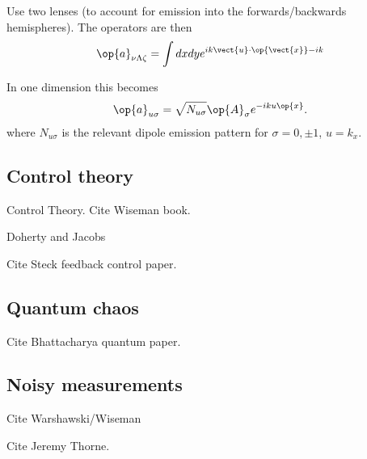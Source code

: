 Use two lenses (to account for emission into the forwards/backwards hemispheres).  
The operators are then 
\begin{align}
  \op{a}_{\nu\Lambda \zeta} = \int dx dy e^{ik \vect{u}\cdot\op{\vect{x}}-ik}
\end{align}

In one dimension this becomes 
\begin{align}
  \op{a}_{u\sigma} = \sqrt{N_{u\sigma}}\op{A}_\sigma e^{-ik u \op{x}}.
\end{align}
where $N_{u\sigma}$ is the relevant dipole emission pattern for $\sigma=0,\pm 1$, $u=k_x$.



\subsection{Control theory}
 Control Theory.  Cite Wiseman book.   \cite{WisemanMilburn2010}

Doherty and Jacobs \cite{Doherty1999}

Cite Steck feedback control paper.  \cite{Steck2004, Steck2006}

\subsection{Quantum chaos}

Cite Bhattacharya quantum paper.  \cite{Bhattacharya2000}

\subsection{Noisy measurements}
Cite Warshawski/Wiseman \cite{Warszawski2003a,Warszawski2003b}

Cite Jeremy Thorne.  


